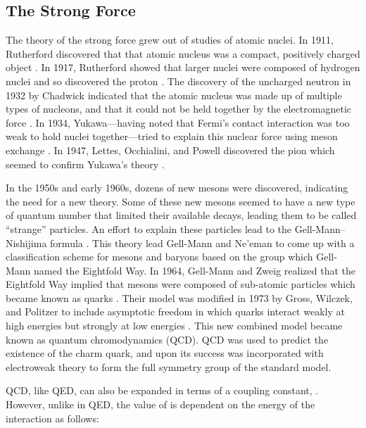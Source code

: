 \subsection{The Strong Force}
\label{subsection:Strong_force}

The theory of the strong force grew out of studies of atomic nuclei. In 1911,
Rutherford discovered that that atomic nucleus was a compact, positively
charged object \cite{rutherford1911}. In 1917, Rutherford showed that larger
nuclei were composed of hydrogen nuclei and so discovered the proton
\cite{rutherford1919}. The discovery of the uncharged neutron in 1932 by
Chadwick indicated that the atomic nucleus was made up of multiple types of
nucleons, and that it could not be held together by the electromagnetic force
\cite{chadwick1932}. In 1934, Yukawa---having noted that Fermi's contact
interaction was too weak to hold nuclei together---tried to explain this
nuclear force using meson exchange \cite{yukawa1935}. In 1947, Lettes,
Occhialini, and Powell discovered the pion which seemed to confirm Yukawa's
theory \cite{lattes1947}.

In the 1950s and early 1960s, dozens of new mesons were discovered, indicating
the need for a new theory. Some of these new mesons seemed to have a new type
of quantum number that limited their available decays, leading them to be
called ``strange'' particles. An effort to explain these particles lead to the
Gell-Mann--Nishijima formula
\cite{nakano1953}\cite{nishijima1955}\cite{gellmann1956}. This theory lead
Gell-Mann and Ne'eman to come up with a classification scheme for mesons and
baryons based on the \SUthree group which Gell-Mann named the Eightfold Way. In
1964, Gell-Mann and Zweig realized that the Eightfold Way implied that mesons
were composed of sub-atomic particles which became known as quarks
\cite{gellmann1964}\cite{zweig1964}. Their model was modified in 1973 by Gross,
Wilczek, and Politzer to include asymptotic freedom in which quarks interact
weakly at high energies but strongly at low energies
\cite{gross_1973}\cite{politzer_1973}. This new combined model became known as
quantum chromodynamics (QCD). QCD was used to predict the existence of the
charm quark, and upon its success was incorporated with electroweak theory to
form the full \SUthreeSUtwoUone symmetry group of the standard model.

QCD, like QED, can also be expanded in terms of a coupling constant,
\alphastrong. However, unlike \fsc in QED, the value of \alphastrong is
dependent on the energy of the interaction as follows:

